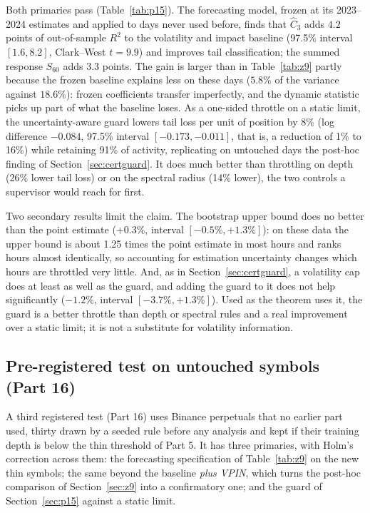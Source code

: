 \documentclass[12pt]{article}
\theoremstyle{definition}
\theoremstyle{remark}
\begin{document}
Both primaries pass (Table~\ref{tab:p15}). The forecasting model, frozen at its 2023--2024 estimates and applied to days never used before, finds that $\hat C_3$ adds $4.2$ points of out-of-sample $R^2$ to the volatility and impact baseline (97.5\% interval $[1.6,8.2]$, Clark--West $t=9.9$) and improves tail classification; the summed response $S_{60}$ adds $3.3$ points. The gain is larger than in Table~\ref{tab:z9} partly because the frozen baseline explains less on these days ($5.8\%$ of the variance against $18.6\%$): frozen coefficients transfer imperfectly, and the dynamic statistic picks up part of what the baseline loses. As a one-sided throttle on a static limit, the uncertainty-aware guard lowers tail loss per unit of position by 8\% (log difference $-0.084$, 97.5\% interval $[-0.173,-0.011]$, that is, a reduction of 1\% to 16\%) while retaining 91\% of activity, replicating on untouched days the post-hoc finding of Section~\ref{sec:certguard}. It does much better than throttling on depth (26\% lower tail loss) or on the spectral radius (14\% lower), the two controls a supervisor would reach for first.

Two secondary results limit the claim. The bootstrap upper bound does no better than the point estimate ($+0.3\%$, interval $[-0.5\%,+1.3\%]$): on these data the upper bound is about 1.25 times the point estimate in most hours and ranks hours almost identically, so accounting for estimation uncertainty changes which hours are throttled very little. And, as in Section~\ref{sec:certguard}, a volatility cap does at least as well as the guard, and adding the guard to it does not help significantly ($-1.2\%$, interval $[-3.7\%,+1.3\%]$). Used as the theorem uses it, the guard is a better throttle than depth or spectral rules and a real improvement over a static limit; it is not a substitute for volatility information.

\subsection{Pre-registered test on untouched symbols (Part 16)}\label{sec:p16}
A third registered test (Part 16) uses Binance perpetuals that no earlier part used, thirty drawn by a seeded rule before any analysis and kept if their training depth is below the thin threshold of Part 5. It has three primaries, with Holm's correction across them: the forecasting specification of Table~\ref{tab:z9} on the new thin symbols; the same beyond the baseline \emph{plus VPIN}, which turns the post-hoc comparison of Section~\ref{sec:z9} into a confirmatory one; and the guard of Section~\ref{sec:p15} against a static limit.
\end{document}

